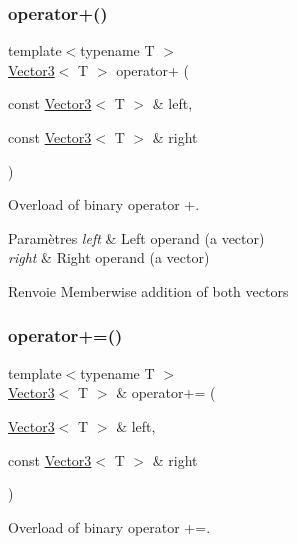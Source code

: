 \subsubsection{\texorpdfstring{operator+()}{operator+()}}
{\footnotesize\ttfamily template$<$typename T $>$ \\
\hyperlink{classsf_1_1Vector3}{Vector3}$<$ T $>$ operator+ (\begin{DoxyParamCaption}\item[{const \hyperlink{classsf_1_1Vector3}{Vector3}$<$ T $>$ \&}]{left,  }\item[{const \hyperlink{classsf_1_1Vector3}{Vector3}$<$ T $>$ \&}]{right }\end{DoxyParamCaption})\hspace{0.3cm}{\ttfamily [related]}}



Overload of binary operator +. 


\begin{DoxyParams}{Paramètres}
{\em left} & Left operand (a vector) \\
\hline
{\em right} & Right operand (a vector)\\
\hline
\end{DoxyParams}
\begin{DoxyReturn}{Renvoie}
Memberwise addition of both vectors 
\end{DoxyReturn}
\mbox{\label{classsf_1_1Vector3_abc28859af163c63318ea2723b81c5ad9}} 
\subsubsection{\texorpdfstring{operator+=()}{operator+=()}}
{\footnotesize\ttfamily template$<$typename T $>$ \\
\hyperlink{classsf_1_1Vector3}{Vector3}$<$ T $>$ \& operator+= (\begin{DoxyParamCaption}\item[{\hyperlink{classsf_1_1Vector3}{Vector3}$<$ T $>$ \&}]{left,  }\item[{const \hyperlink{classsf_1_1Vector3}{Vector3}$<$ T $>$ \&}]{right }\end{DoxyParamCaption})\hspace{0.3cm}{\ttfamily [related]}}



Overload of binary operator +=. 

